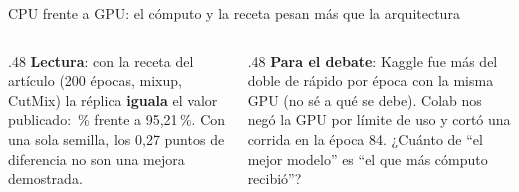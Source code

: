 \begin{frame}{CPU frente a GPU: el cómputo y la receta pesan más que la arquitectura}
  \centering\footnotesize
  \vspace{6pt}
  \begin{columns}[T]
    \begin{column}{.48\textwidth}\footnotesize
      \textbf{Lectura}: con la receta del artículo (200 épocas, mixup, CutMix) la réplica \textbf{iguala} el valor
      publicado: \accKaggle\,\% frente a 95,21\,\%. Con una sola semilla, los 0,27 puntos de diferencia no
      son una mejora demostrada.
    \end{column}
    \begin{column}{.48\textwidth}\footnotesize
      \textbf{Para el debate}: Kaggle fue más del doble de rápido por época con la misma GPU (no sé a qué se debe).
      Colab nos negó la GPU por límite de uso y cortó una corrida en la época 84. ¿Cuánto de ``el mejor modelo'' es
      ``el que más cómputo recibió''?
    \end{column}
  \end{columns}
\end{frame}
